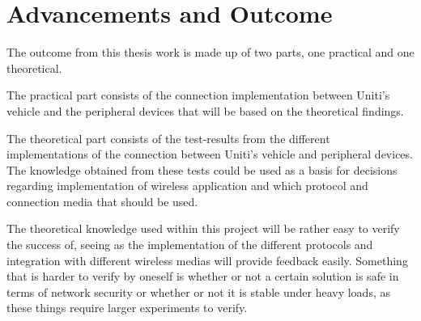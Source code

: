 \documentclass[a4paper]{article}
\begin{document}




\section{Advancements and Outcome}




The outcome from this thesis work is made up of two parts, one practical and one
theoretical.

The practical part consists of the connection implementation between Uniti's
vehicle and the peripheral devices that will be based on the theoretical
findings.

The theoretical part consists of the test-results from the different
implementations of the connection between Uniti's vehicle and peripheral
devices. The knowledge obtained from these tests could be used as a basis for
decisions regarding implementation of wireless application and which protocol
and connection media that should be used.


The theoretical knowledge used within this project will be rather easy
to verify the success of, seeing as the implementation of the different 
protocols and integration with different wireless medias will provide
feedback easily. Something that is harder to verify by oneself is whether
or not a certain solution is safe in terms of network security or whether
or not it is stable under heavy loads, as these things require larger
experiments to verify.
\end{document}
